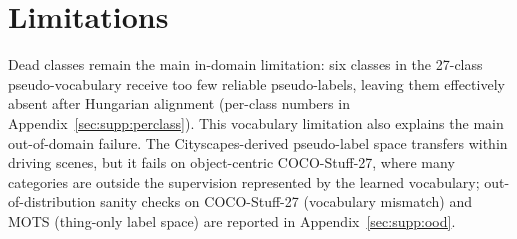 \documentclass{article}
\begin{document}
\section{Limitations}
\label{sec:limitations}

\noindent Dead classes remain the main in-domain limitation: six classes in the 27-class pseudo-vocabulary receive too few reliable pseudo-labels, leaving them effectively absent after Hungarian alignment (per-class numbers in Appendix~\ref{sec:supp:perclass}). This vocabulary limitation also explains the main out-of-domain failure. The Cityscapes-derived pseudo-label space transfers within driving scenes, but it fails on object-centric COCO-Stuff-27, where many categories are outside the supervision represented by the learned vocabulary; out-of-distribution sanity checks on COCO-Stuff-27 (vocabulary mismatch) and MOTS (thing-only label space) are reported in Appendix~\ref{sec:supp:ood}.
\end{document}
